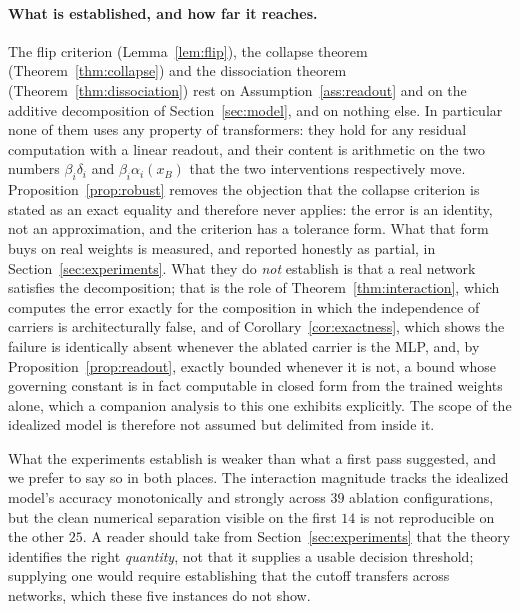 \documentclass[11pt,a4paper]{article}
\begin{document}
\paragraph{What is established, and how far it reaches.} The flip criterion
(Lemma~\ref{lem:flip}), the collapse theorem (Theorem~\ref{thm:collapse}) and
the dissociation theorem (Theorem~\ref{thm:dissociation}) rest on
Assumption~\ref{ass:readout} and on the additive decomposition of
Section~\ref{sec:model}, and on nothing else. In particular none of them uses
any property of transformers: they hold for any residual computation with a
linear readout, and their content is arithmetic on the two numbers
$\beta_i\delta_i$ and $\beta_i\alpha_i(x_B)$ that the two interventions
respectively move. Proposition~\ref{prop:robust} removes the objection that
the collapse criterion is stated as an exact equality and therefore never
applies: the error is an identity, not an approximation, and the criterion has
a tolerance form. What that form buys on real weights is measured, and
reported honestly as partial, in Section~\ref{sec:experiments}. What they do
\emph{not} establish is that a real network
satisfies the decomposition; that is the role of
Theorem~\ref{thm:interaction}, which computes the error exactly for the
composition in which the independence of carriers is architecturally false,
and of
Corollary~\ref{cor:exactness}, which shows the failure is identically absent
whenever the ablated carrier is the MLP, and, by
Proposition~\ref{prop:readout}, exactly bounded whenever it is not, a bound
whose governing constant is in fact computable in closed form from the
trained weights alone, which a companion analysis to this one exhibits
explicitly. The
scope of the idealized model is therefore not assumed but delimited from
inside it.

What the experiments establish is weaker than what a first pass suggested, and
we prefer to say so in both places. The interaction magnitude tracks the
idealized model's accuracy monotonically and strongly across $39$ ablation
configurations, but the clean numerical separation visible on the first $14$
is not reproducible on the other $25$. A reader should take from
Section~\ref{sec:experiments} that the theory identifies the right
\emph{quantity}, not that it supplies a usable decision threshold; supplying
one would require establishing that the cutoff transfers across networks,
which these five instances do not show.
\end{document}
